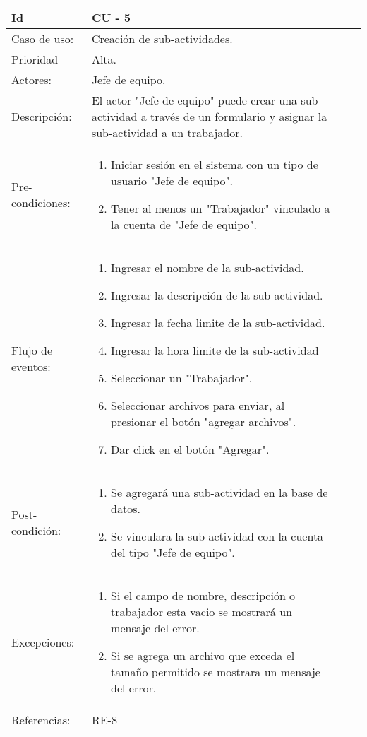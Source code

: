 \documentclass[11pt,a4paper]{article}
\begin{document}
\begin{tabular}[c]{|p{3cm}|p{13cm}|p{2.5cm}|p{3cm}|}
\hline 
\rule[-1ex]{0pt}{2.5ex} Id & CU - 5\\ 
\hline 
\rule[-1ex]{0pt}{2.5ex} Caso de uso: &  Creación de sub-actividades.\\ 
\hline 
\rule[-1ex]{0pt}{2.5ex} Prioridad & Alta. \\ 
\hline 
\rule[-1ex]{0pt}{2.5ex} Actores: & Jefe de equipo. \\ 
\hline 
\rule[-1ex]{0pt}{2.5ex} Descripción: & El actor "Jefe de equipo" puede crear una sub-actividad a través de un formulario y asignar la sub-actividad a un trabajador.\\ 
\hline 
\rule[-1ex]{0pt}{2.5ex} Pre-condiciones: & \begin{enumerate}
\item Iniciar sesión en el sistema con un tipo de usuario "Jefe de equipo".
\item Tener al menos un "Trabajador" vinculado a la cuenta de "Jefe de equipo".
\end{enumerate}  \\ 
\hline 
\rule[-1ex]{0pt}{2.5ex} Flujo de eventos: & \begin{enumerate}
\item Ingresar el nombre de la sub-actividad.
\item Ingresar la descripción de la sub-actividad.
\item Ingresar la fecha limite de la sub-actividad.
\item Ingresar la hora limite de la sub-actividad
\item Seleccionar un "Trabajador".
\item Seleccionar archivos para enviar, al presionar el botón "agregar archivos".
\item Dar click en el botón "Agregar".
\end{enumerate} \\ 
\hline 
\rule[-1ex]{0pt}{2.5ex} Post-condición: & \begin{enumerate}
\item Se agregará una sub-actividad en la base de datos.
\item Se vinculara la sub-actividad con la cuenta del tipo "Jefe de equipo".
\end{enumerate} \\ 
\hline 
\rule[-1ex]{0pt}{2.5ex} Excepciones: & \begin{enumerate}
\item Si el campo de nombre, descripción o trabajador esta vacio se mostrará un mensaje del error.
\item Si se agrega un archivo que exceda el tamaño permitido se mostrara un mensaje del error.
\end{enumerate} \\
\hline 
\rule[-1ex]{0pt}{2.5ex} Referencias: & RE-8\\ 
\hline 
\end{tabular} 
\end{document}
